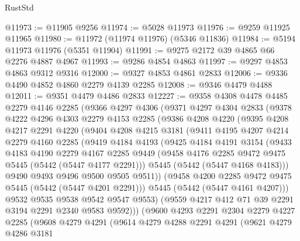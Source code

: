 \begin{lexlean}{RustStd}
\begin{coremodule}
{\begin{coremodule}
{{{{{{{{{{{{@11973 := @11905 @9256
@11974 := @5028 @11973
@11976 := @9259 @11925 @11965
@11980 := @11972 (@11974 @11976) (@5346 @11836)
@11984 := @5194 @11973 @11976 (@5351 @11904)
@11991 := @9275 @2172 @39 @4865 @66 @2276 @4887 @4967
@11993 := @9286 @4854 @4863
@11997 := @9297 @4853 @4863 @9312 @9316
@12000 := @9327 @4853 @4861 @2833
@12006 := @9336 @4490 @4852 @4860 @2279 @4139 @2285
@12008 := @9346 @4479 @4488
@12011 := @9351 @4479 @4486 @2833
@12227 := @9358
    @4308
    @4478
    @4485
    @2279
    @4146
    @2285
    (@9366
      @4297
      @4306
      (@9371
        @4297
        @4304
        @2833
        (@9378
          @4222
          @4296
          @4303
          @2279
          @4153
          @2285
          (@9386
            @4208
            @4220
            (@9395
              @4208
              @4217
              @2291
              @4220
              (@9404
                @4208
                @4215
                @3181
                (@9411
                  @4195
                  @4207
                  @4214
                  @2279
                  @4160
                  @2285
                  (@9419
                    @4184
                    @4193
                    (@9425
                      @4184
                      @4191
                      @3154
                      (@9433
                        @4183
                        @4190
                        @2279
                        @4167
                        @2285
                        @9449
                        (@9458 @4176 @2285 @9472 @9475 @5445 (@5442 (@5447 @4177 @2291)))
                        @5445
                        (@5442 (@5447 @4168 @4183)))
                      @9490
                      @9493
                      @9496
                      @9500
                      @9505
                      @9511))
                  (@9458 @4200 @2285 @9472 @9475 @5445 (@5442 (@5447 @4201 @2291)))
                  @5445
                  (@5442 (@5447 @4161 @4207)))
                @9532
                @9535
                @9538
                @9542
                @9547
                @9553)
              (@9559 @4217 @412 @71 @39 @2291 @3194 @2291 @2340 @9583 @9592)))
          (@9600
            @4293
            @2291
            @2304
            @2279
            @4227
            @2285
            (@9608
              @4279
              @4291
              (@9614
                @4279
                @4288
                @2291
                @4291
                (@9621
                  @4279
                  @4286
                  @3181
}}}}}}}}}}}}
\end{coremodule}}
\end{coremodule}
\end{lexlean}
